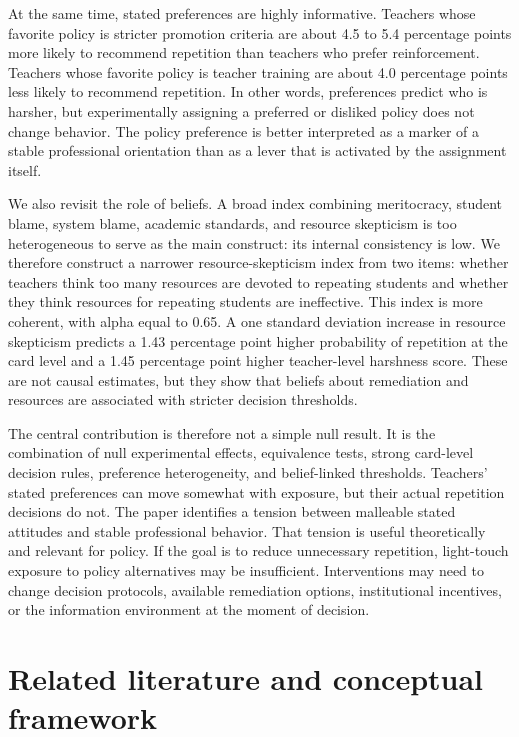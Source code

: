 \documentclass[12pt,a4paper]{article}
\begin{document}
At the same time, stated preferences are highly informative. Teachers whose favorite policy is stricter promotion criteria are about 4.5 to 5.4 percentage points more likely to recommend repetition than teachers who prefer reinforcement. Teachers whose favorite policy is teacher training are about 4.0 percentage points less likely to recommend repetition. In other words, preferences predict who is harsher, but experimentally assigning a preferred or disliked policy does not change behavior. The policy preference is better interpreted as a marker of a stable professional orientation than as a lever that is activated by the assignment itself.

We also revisit the role of beliefs. A broad index combining meritocracy, student blame, system blame, academic standards, and resource skepticism is too heterogeneous to serve as the main construct: its internal consistency is low. We therefore construct a narrower resource-skepticism index from two items: whether teachers think too many resources are devoted to repeating students and whether they think resources for repeating students are ineffective. This index is more coherent, with alpha equal to 0.65. A one standard deviation increase in resource skepticism predicts a 1.43 percentage point higher probability of repetition at the card level and a 1.45 percentage point higher teacher-level harshness score. These are not causal estimates, but they show that beliefs about remediation and resources are associated with stricter decision thresholds.

The central contribution is therefore not a simple null result. It is the combination of null experimental effects, equivalence tests, strong card-level decision rules, preference heterogeneity, and belief-linked thresholds. Teachers' stated preferences can move somewhat with exposure, but their actual repetition decisions do not. The paper identifies a tension between malleable stated attitudes and stable professional behavior. That tension is useful theoretically and relevant for policy. If the goal is to reduce unnecessary repetition, light-touch exposure to policy alternatives may be insufficient. Interventions may need to change decision protocols, available remediation options, institutional incentives, or the information environment at the moment of decision.

\section{Related literature and conceptual framework}
\end{document}
